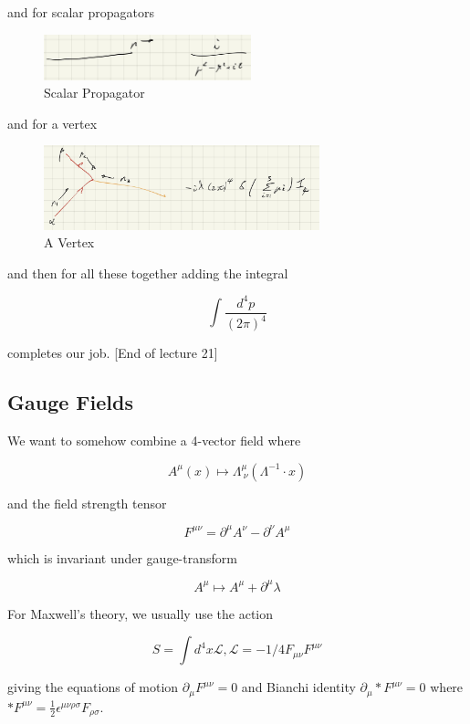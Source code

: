 \documentclass{article}
\theoremstyle{definition}
\begin{document}
and for scalar propagators

\begin{figure}[H]
\centering
\includegraphics[width=6cm]{res/QFT/feynman_scalar_propagator}
\caption{Scalar Propagator}
\label{feynman_scalar_propagator}
\end{figure}

and for a vertex

\begin{figure}[H]
\centering
\includegraphics[width=8cm]{res/QFT/feynman_vertex}
\caption{A Vertex}
\label{feynman_vertex}
\end{figure}

and then for all these together adding the integral

$$ \int \frac{d^4p}{(2\pi)^4} $$

completes our job. [End of lecture 21]

\subsection{Gauge Fields}

We want to somehow combine a 4-vector field where

$$ A^\mu(x) \mapsto \Lambda^\mu_{\ \nu}(\Lambda^{-1} \cdot x) $$

and the field strength tensor

$$ F^{\mu \nu} = \partial^\mu A^\nu - \partial^\nu A^\mu $$

which is invariant under gauge-transform

$$ A^\mu \mapsto A^\mu + \partial^\mu \lambda $$

For Maxwell's theory, we usually use the action

$$ S = \int d^4 x \mathcal{L}, \mathcal{L} = -1/4 F_{\mu \nu} F^{\mu \nu} $$

giving the equations of motion $\partial_\mu F^{\mu \nu} = 0$ and Bianchi
identity $\partial_\mu *F^{\mu \nu} = 0$ where $*F^{\mu \nu} = \frac{1}{2}
\epsilon^{\mu \nu \rho \sigma} F_{\rho \sigma}$. 
\end{document}
